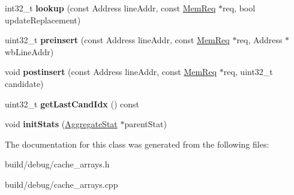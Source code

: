 \begin{DoxyCompactItemize}
\item 
\hypertarget{classZArray_afbacb82458862d0eced5d9419f352815}{int32\-\_\-t {\bfseries lookup} (const Address line\-Addr, const \hyperlink{structMemReq}{Mem\-Req} $\ast$req, bool update\-Replacement)}\label{classZArray_afbacb82458862d0eced5d9419f352815}

\item 
\hypertarget{classZArray_ab6ac38b3f726386bf451d23e25cc0f92}{uint32\-\_\-t {\bfseries preinsert} (const Address line\-Addr, const \hyperlink{structMemReq}{Mem\-Req} $\ast$req, Address $\ast$wb\-Line\-Addr)}\label{classZArray_ab6ac38b3f726386bf451d23e25cc0f92}

\item 
\hypertarget{classZArray_a1a85633b823d1ca9626763d9b5411f4c}{void {\bfseries postinsert} (const Address line\-Addr, const \hyperlink{structMemReq}{Mem\-Req} $\ast$req, uint32\-\_\-t candidate)}\label{classZArray_a1a85633b823d1ca9626763d9b5411f4c}

\item 
\hypertarget{classZArray_a11b052fd25fe70479e9026f26886cdaf}{uint32\-\_\-t {\bfseries get\-Last\-Cand\-Idx} () const }\label{classZArray_a11b052fd25fe70479e9026f26886cdaf}

\item 
\hypertarget{classZArray_ab5adc62a1e1440d3517f3fe9c486915d}{void {\bfseries init\-Stats} (\hyperlink{classAggregateStat}{Aggregate\-Stat} $\ast$parent\-Stat)}\label{classZArray_ab5adc62a1e1440d3517f3fe9c486915d}

\end{DoxyCompactItemize}


The documentation for this class was generated from the following files\-:\begin{DoxyCompactItemize}
\item 
build/debug/cache\-\_\-arrays.\-h\item 
build/debug/cache\-\_\-arrays.\-cpp\end{DoxyCompactItemize}
